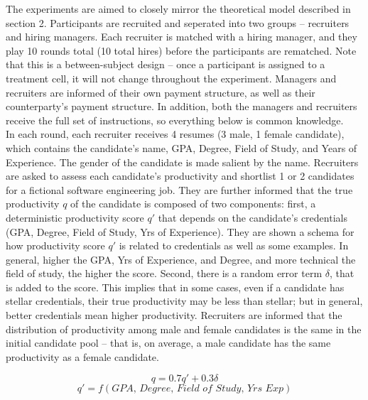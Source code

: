 \documentclass[11pt]{article}
\begin{document}
The experiments are aimed to closely mirror the theoretical model described in section 2. Participants are recruited and seperated into two groups -- recruiters and hiring managers. Each recruiter is matched with a hiring manager, and they play 10 rounds total (10 total hires) before the participants are rematched.  Note that this is a between-subject design -- once a participant is assigned to a treatment cell, it will not change throughout the experiment. Managers and recruiters are informed of their own payment structure, as well as their counterparty's payment structure. In addition, both the managers and recruiters receive the full set of instructions, so everything below is common knowledge.
\\

In each round, each recruiter receives 4 resumes (3 male, 1 female candidate)\footnotemark, which contains the candidate's name, GPA, Degree, Field of Study, and Years of Experience. The gender of the candidate is made salient by the name. Recruiters are asked to assess each candidate's productivity and shortlist 1 or 2 candidates for a fictional software engineering job. They are further informed that the true productivity $q$ of the candidate is composed of two components: first, a deterministic productivity score $q'$ that depends on the candidate's credentials (GPA, Degree, Field of Study, Yrs of Experience). They are shown a schema for how productivity score $q'$ is related to credentials as well as some examples. In general, higher the GPA, Yrs of Experience, and Degree, and more technical the field of study, the higher the score. Second, there is a random error term $\delta$, that is added to the score. This implies that in some cases, even if a candidate has stellar credentials, their true productivity may be less than stellar; but in general, better credentials mean higher productivity. Recruiters are informed that the distribution of productivity among male and female candidates is the same in the initial candidate pool -- that is, on average, a male candidate has the same productivity as a female candidate.


$$q = 0.7q' + 0.3\delta$$
$$q' = f(\textit{GPA, Degree, Field of Study, Yrs Exp})$$


\end{document}

